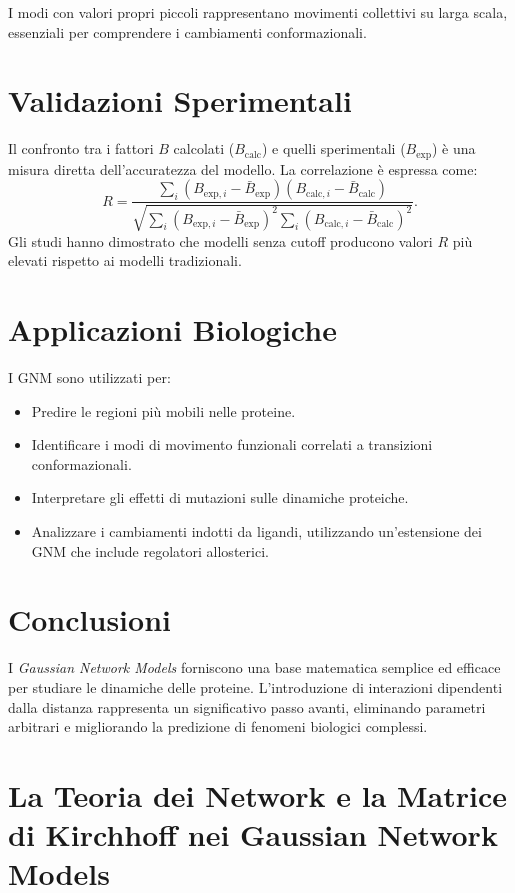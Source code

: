 \documentclass[Lau,binding=0.6cm,oneside,noexaminfo]{sapthesis}
\begin{document}
I modi con valori propri piccoli rappresentano movimenti collettivi su larga scala, essenziali per comprendere i cambiamenti conformazionali.

\section{Validazioni Sperimentali}
Il confronto tra i fattori \(B\) calcolati (\(B_{\text{calc}}\)) e quelli sperimentali (\(B_{\text{exp}}\)) è una misura diretta dell'accuratezza del modello. La correlazione è espressa come:
\begin{equation}
    R = \frac{\sum_i (B_{\text{exp},i} - \bar{B}_{\text{exp}})(B_{\text{calc},i} - \bar{B}_{\text{calc}})}{\sqrt{\sum_i (B_{\text{exp},i} - \bar{B}_{\text{exp}})^2 \sum_i (B_{\text{calc},i} - \bar{B}_{\text{calc}})^2}}.
\end{equation}
Gli studi hanno dimostrato che modelli senza cutoff producono valori \(R\) più elevati rispetto ai modelli tradizionali.

\section{Applicazioni Biologiche}
I GNM sono utilizzati per:
\begin{itemize}
    \item Predire le regioni più mobili nelle proteine.
    \item Identificare i modi di movimento funzionali correlati a transizioni conformazionali.
    \item Interpretare gli effetti di mutazioni sulle dinamiche proteiche.
    \item Analizzare i cambiamenti indotti da ligandi, utilizzando un'estensione dei GNM che include regolatori allosterici.
\end{itemize}

\section{Conclusioni}
I \emph{Gaussian Network Models} forniscono una base matematica semplice ed efficace per studiare le dinamiche delle proteine. L'introduzione di interazioni dipendenti dalla distanza rappresenta un significativo passo avanti, eliminando parametri arbitrari e migliorando la predizione di fenomeni biologici complessi.
\section{La Teoria dei Network e la Matrice di Kirchhoff nei Gaussian Network Models}
\end{document}
